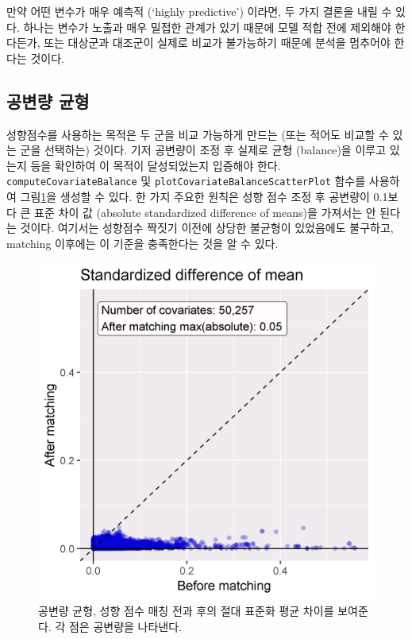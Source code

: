\documentclass[11pt]{book}
\theoremstyle{definition}
\theoremstyle{definition}
\theoremstyle{definition}
\theoremstyle{remark}
\let\BeginKnitrBlock\begin \let\EndKnitrBlock\end
\begin{document}
\BeginKnitrBlock{rmdimportant}
만약 어떤 변수가 매우 예측적 (`highly predictive') 이라면, 두 가지
결론을 내릴 수 있다. 하나는 변수가 노출과 매우 밀접한 관계가 있기 때문에
모델 적합 전에 제외해야 한다든가, 또는 대상군과 대조군이 실제로 비교가
불가능하기 때문에 분석을 멈추어야 한다는 것이다.
\EndKnitrBlock{rmdimportant}

\subsection{공변량 균형}\label{-}

성향점수를 사용하는 목적은 두 군을 비교 가능하게 만드는 (또는 적어도
비교할 수 있는 군을 선택하는) 것이다. 기저 공변량이 조정 후 실제로 균형
(balance)을 이루고 있는지 등을 확인하여 이 목적이 달성되었는지 입증해야
한다. \texttt{computeCovariateBalance} 및
\texttt{plotCovariateBalanceScatterPlot} 함수를 사용하여
그림\ref{fig:balance}을 생성할 수 있다. 한 가지 주요한 원칙은 성향 점수
조정 후 공변량이 0.1보다 큰 표준 차이 값 (absolute standardized
difference of means)을 가져서는 안 된다는 것이다. 여기서는 성향점수
짝짓기 이전에 상당한 불균형이 있었음에도 불구하고, matching 이후에는 이
기준을 충족한다는 것을 알 수 있다.

\begin{figure}

{\centering \includegraphics[width=0.7\linewidth]{images/PopulationLevelEstimation/balance} 

}

\caption{공변량 균형, 성향 점수 매칭 전과 후의 절대 표준화 평균 차이를 보여준다. 각 점은 공변량을 나타낸다.}\label{fig:balance}
\end{figure}
\end{document}
